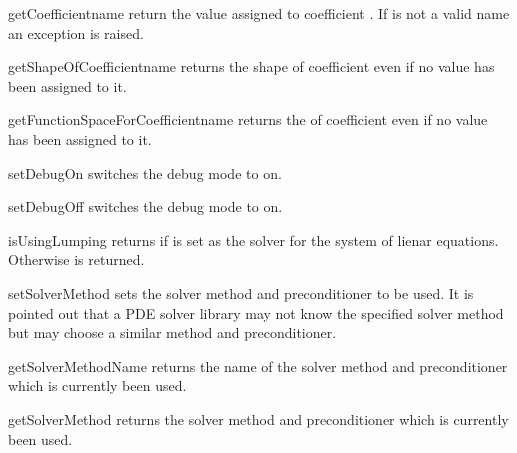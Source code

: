 \begin{methoddesc}[LinearPDE]{getCoefficient}{name}
return the value assigned to coefficient . If  is not a valid name
an exception is raised.
\end{methoddesc}

\begin{methoddesc}[LinearPDE]{getShapeOfCoefficient}{name}
returns the shape of coefficient  even if no value has been assigned to it.
\end{methoddesc}

\begin{methoddesc}[LinearPDE]{getFunctionSpaceForCoefficient}{name}
returns the \FunctionSpace of coefficient  even if no value has been assigned to it.
\end{methoddesc}

\begin{methoddesc}[LinearPDE]{setDebugOn}{}
switches the debug mode to on.
\end{methoddesc}

\begin{methoddesc}[LinearPDE]{setDebugOff}{}
switches the debug mode to on.
\end{methoddesc}

\begin{methoddesc}[LinearPDE]{isUsingLumping}{}
returns \True if \LUMPING is set as the solver for the system of lienar equations.
Otherwise \False is returned.
\end{methoddesc}

\begin{methoddesc}[LinearPDE]{setSolverMethod}{}
sets the solver method and preconditioner to be used. It is pointed out that a PDE solver library
may not know the specified solver method but may choose a similar method and preconditioner.
\end{methoddesc}

\begin{methoddesc}[LinearPDE]{getSolverMethodName}{}
returns the name of the solver method and preconditioner which is currently been used.
\end{methoddesc}

\begin{methoddesc}[LinearPDE]{getSolverMethod}{}
returns the solver method and preconditioner which is currently been used.
\end{methoddesc}

